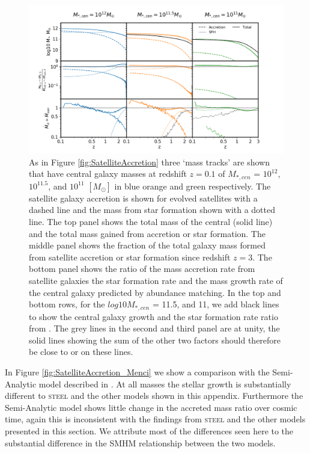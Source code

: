 \begin{figure}
	\centering
	\includegraphics[width = \linewidth]{Appendices/StellarMassAssembly/SatelliteAccretion_UniM.png}
    \caption{As in Figure \ref{fig:SatelliteAccretion} three `mass tracks' are shown that have central galaxy masses at redshift $z = 0.1$ of $M_{*,cen}$ = $10^{12}$, $10^{11.5}$, and $10^{11}$ $[M_{\odot}]$ in blue orange and green respectively. The satellite galaxy accretion is shown for evolved satellites with a dashed line and the mass from star formation shown with a dotted line. The top panel shows the total mass of the central (solid line) and the total mass gained from accretion or star formation. The middle panel shows the fraction of the total galaxy mass formed from satellite accretion or star formation since redshift $z=3$. The bottom panel shows the ratio of the mass accretion rate from satellite galaxies the star formation rate and the mass growth rate of the central galaxy predicted by abundance matching. In the top and bottom rows, for the $log 10 M_{*,cen}$ = 11.5, and 11, we add black lines to show the central galaxy growth and the star formation rate ratio from \citet{Behroozi2019UniverseMachine:010}. The grey lines in the second and third panel are at unity, the solid lines showing the sum of the other two factors should therefore be close to or on these lines.}
	\label{fig:SatelliteAccretion_UniM}
\end{figure}

In Figure \ref{fig:SatelliteAccretion_Menci} we show a comparison with the Semi-Analytic model described in \citet{Menci2014TriggeringInteractions}. At all masses the stellar growth is substantially different to \textsc{steel} and the other models shown in this appendix. Furthermore the Semi-Analytic model shows little change in the accreted mass ratio over cosmic time, again this is inconsistent with the findings from \textsc{steel} and the other models presented in this section. We attribute most of the differences seen here to the substantial difference in the SMHM relationship between the two models.

